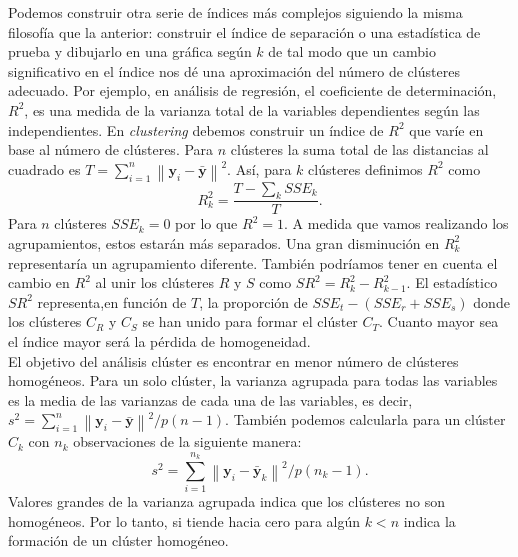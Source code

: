 \documentclass[a4paper, 20pt]{article}
\newcommand{\norm}[1]{\left\lVert#1\right\rVert}
\newcommand{\yy}{\textbf{y}}
\begin{document}
Podemos construir otra serie de índices más complejos siguiendo la misma filosofía que la anterior: construir el índice de separación o una estadística de prueba y dibujarlo en una gráfica según $ k $ de tal modo que un cambio significativo en el índice nos dé una aproximación del número de clústeres adecuado. Por ejemplo, en análisis de regresión, el coeficiente de determinación, $ R^2 $, es una medida de la varianza total de la variables dependientes según las independientes. En \textit{clustering} debemos construir un índice de $ R^2 $ que varíe en base al número de clústeres. Para $ n $ clústeres la suma total de las distancias al cuadrado es $ T = \sum_{i = 1}^{n} \norm{\yy_i - \bar{\yy}}^2 $. Así, para $ k $ clústeres definimos $ R^2 $ como
\[
R^{2}_{k} = \frac{T - \sum_k SSE_k}{T}.
\]
Para $ n $ clústeres $ SSE_k = 0 $ por lo que $ R^2 = 1 $. A medida que vamos realizando los agrupamientos, estos estarán más separados. Una gran disminución en $ R^2_k $ representaría un agrupamiento diferente. También podríamos tener en cuenta el cambio en $ R^2 $ al unir los clústeres $ R $ y $ S $ como $ SR^2 = R_k^2 - R^2_{k-1} $. El estadístico $ SR^2 $ representa,en función de $ T $, la proporción de $ SSE_t - (SSE_r + SSE_s) $ donde los clústeres $ C_R $ y $ C_S $ se han unido para formar el clúster $ C_T $.  Cuanto mayor sea el índice mayor será la pérdida de homogeneidad.\\

El objetivo del análisis clúster es encontrar en menor número de clústeres homogéneos. Para un solo clúster, la varianza agrupada para todas las variables es la media de las varianzas de cada una de las variables, es decir, $ s^2 = \sum_{i=1}^{n} \norm{\yy_i - \bar{\yy}}^2/ p(n-1)$. También podemos calcularla para un clúster $ C_k $ con $ n_k $ observaciones de la siguiente manera:
\[
s^2 = \sum_{i=1}^{n_k} \norm{\yy_i - \bar{\yy}_k}^2/ p(n_k-1).
\]
Valores grandes de la varianza agrupada indica que los clústeres no son homogéneos. Por lo tanto, si tiende hacia cero para algún $  k < n $ indica la formación de un clúster homogéneo. \\
\end{document}
